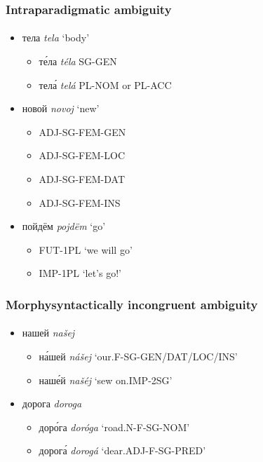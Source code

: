 \documentclass{beamer}
\newcommand{\rus}[1]{\foreignlanguage{russian}{#1}}
\begin{document}
\begin{frame}
\frametitle{Intraparadigmatic ambiguity}
\framesubtitle{}
\begin{itemize}
	\item \rus{тела} \emph{tela} `body'
	\begin{itemize}
		\item \rus{т\'{е}ла} \emph{téla} SG-GEN
		\item \rus{тел\'{а}} \emph{telá} PL-NOM or PL-ACC
	\end{itemize}
	\pause
	\item \rus{новой} \emph{novoj} `new'
	\begin{itemize}
		\item ADJ-SG-FEM-GEN
		\item ADJ-SG-FEM-LOC
		\item ADJ-SG-FEM-DAT
		\item ADJ-SG-FEM-INS
	\end{itemize}
	\pause
	\item \rus{пойдём} \emph{pojdëm} `go'
	\begin{itemize}
		\item FUT-1PL `we will go'
		\item IMP-1PL `let's go!'
	\end{itemize}
\end{itemize}
\end{frame}

\begin{frame}
\frametitle{Morphysyntactically incongruent ambiguity}
\framesubtitle{}
\begin{itemize}
	\item \rus{нашей} \emph{našej}
	\begin{itemize}
		\item \rus{н\'{а}шей} \emph{nášej} `our.F-SG-GEN/DAT/LOC/INS'
		\item \rus{наш\'{е}й} \emph{našéj} `sew on.IMP-2SG'
	\end{itemize}
	\pause
	\item \rus{дорога} \emph{doroga}
	\begin{itemize}
		\item \rus{дор\'{о}га} \emph{doróga} `road.N-F-SG-NOM'
    	\item \rus{дорог\'{а}} \emph{dorogá} `dear.ADJ-F-SG-PRED'
	\end{itemize}
\end{itemize}
\end{frame}
\end{document}

